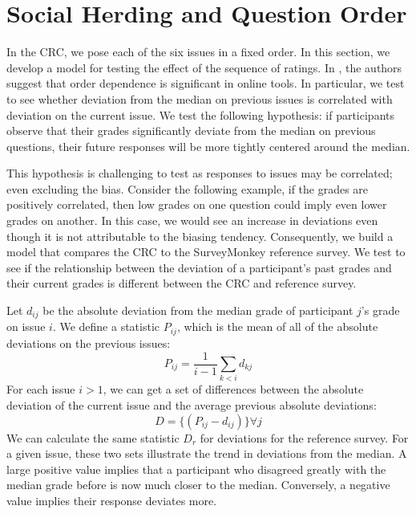 \section{Social Herding and Question Order}
\label{path}
In the CRC, we pose each of the six issues in a fixed order.
In this section, we develop a model for testing the effect of the sequence of ratings.
In \cite{???}, the authors suggest that order dependence is significant in online tools.
In particular, we test to see whether deviation from the median on previous issues is correlated with deviation on the current issue.
We test the following hypothesis: if participants observe that their grades significantly deviate from the median on previous questions, their future responses will be more tightly centered around the median.

This hypothesis is challenging to test as responses to issues may be correlated; even excluding the bias.
Consider the following example, if the grades are positively correlated, then low grades on one question could imply even lower grades on another.
In this case, we would see an increase in deviations even though it is not attributable to the biasing tendency.
Consequently, we build a model that compares the CRC to the SurveyMonkey reference survey.
We test to see if the relationship between the deviation of a participant's past grades and their current grades is different between the CRC and reference survey.

Let $d_{ij}$ be the absolute deviation from the median grade of participant $j$'s grade on issue $i$. 
We define a statistic $P_{ij}$, which is the mean of all of the absolute deviations on the previous issues:
\begin{equation}
P_{ij} = \frac{1}{i-1} \sum_{k < i}  d_{kj}
\end{equation}
For each issue $i > 1$, we can get a set of differences between the absolute deviation of the current issue and the average previous absolute deviations:
\begin{equation}
D = \{(P_{ij}-d_{ij})\} \forall j
\end{equation}
We can calculate the same statistic $D_r$ for deviations for the reference survey.
For a given issue, these two sets illustrate the trend in deviations from the median.
A large positive value implies that a participant who disagreed greatly with the median grade before is now much closer to the median.
Conversely, a negative value implies their response deviates more.

